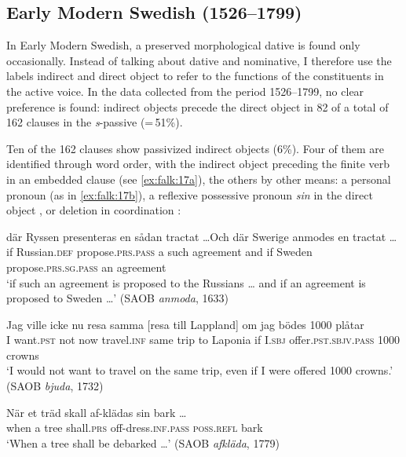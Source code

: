 \documentclass[output=paper]{langscibook}
\begin{document}
\subsection{Early Modern Swedish (1526–1799)}\label{sec:falk:3.4}


In Early Modern Swedish, a preserved morphological dative is found only occasionally. Instead of talking about dative and nominative, I therefore use the labels indirect and direct object to refer to the functions of the constituents in the active voice. In the data collected from the period 1526–1799, no clear preference is found: indirect objects precede the direct object in 82 of a total of 162 clauses in the \textit{s}{}-passive (=\,51\%).


Ten of the 162 clauses show passivized indirect objects (6\%). Four of them are identified through word order, with the indirect object preceding the finite verb in an embedded clause (see \ref{ex:falk:17a}), the others by other means: a personal pronoun (as in \ref{ex:falk:17b}), a reflexive possessive pronoun \textit{sin} in the direct object , or deletion in coordination :


\ea%
    \label{ex:falk:17}
\ea\label{ex:falk:17a}
\gll där  Ryssen      presenteras       en  sådan  tractat …Och    där    Swerige  anmodes            en  tractat …\\
if    Russian\textsc{.def}  propose\textsc{.prs}.\textsc{pass}    a  such    agreement     and    if         Sweden  propose\textsc{.prs}.\textsc{sg}.\textsc{pass}  an  agreement\\
\glt ‘if such an agreement is proposed to the Russians … and if an agreement is         proposed to Sweden …’ {(SAOB \textit{anmoda}, 1633)}

\ex\label{ex:falk:17b}
\gll Jag  ville      icke  nu    resa      samma [resa till Lappland] om  jag  bödes           1000  plåtar\\
I    want.\textsc{pst}  not  now  travel\textsc{.inf}  same     trip to Laponia  if  I.\textsc{sbj}   offer.\textsc{pst.sbjv}.\textsc{pass}  1000  crowns\\
\glt ‘I would not want to travel on the same trip, even if I were offered 1000 crowns.’ (SAOB \textit{bjuda}, 1732)

\ex\label{ex:falk:17c}
\gll När  et  träd  skall        af-klädas          sin        bark … \\
      when  a  tree  shall.\textsc{prs}  off-dress\textsc{.inf}.\textsc{pass}  \textsc{poss}.\textsc{refl}    bark\\
\glt ‘When a tree shall be debarked …’ (SAOB \textit{afkläda}, 1779)
\end{document}
